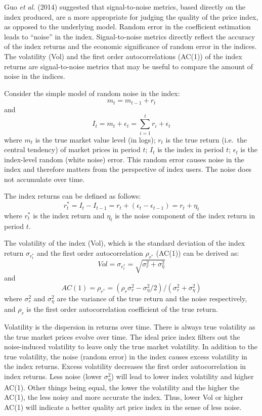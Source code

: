 \documentclass[12pt,]{article}
\begin{document}
Guo \emph{et al.} (2014) suggested that signal-to-noise metrics, based
directly on the index produced, are a more appropriate for judging the
quality of the price index, as opposed to the underlying model. Random
error in the coefficient estimation leads to ``noise'' in the index.
Signal-to-noise metrics directly reflect the accuracy of the index
returns and the economic significance of random error in the indices.
The volatility (Vol) and the first order autocorrelations (AC(1)) of the
index returns are signal-to-noise metrics that may be useful to compare
the amount of noise in the indices.

Consider the simple model of random noise in the index:
\[m_t=m_{t-1}+r_t\] and
\[I_t=m_t+\epsilon_t=\sum_{i=1}^tr_i+\epsilon_t\] where \(m_t\) is the
true market value level (in logs); \(r_t\) is the true return (i.e.~the
central tendency) of market prices in period \(t\); \(I_t\) is the index
in period \(t\); \(\epsilon_t\) is the index-level random (white noise)
error. This random error causes noise in the index and therefore matters
from the perspective of index users. The noise does not accumulate over
time.

The index returns can be defined as follows:
\[r_t^*=I_t-I_{t-1}=r_t+(\epsilon_t-\epsilon_{t-1})= r_t+\eta_t\] where
\(r_t^*\) is the index return and \(\eta_t\) is the noise component of
the index return in period \(t\).

The volatility of the index (Vol), which is the standard deviation of
the index return \(\sigma_{r_t^*}\) and the first order autocorrelation
\(\rho_{r^*}\) (AC(1)) can be derived as:
\[Vol = \sigma_{r_t^*} = \sqrt{\sigma_r^2 + \sigma_\eta^2}\] and
\[AC(1) = \rho_{r^*} = (\rho_r \sigma_r^2 - \sigma_\eta^2/2) / (\sigma_r^2 + \sigma_\eta^2)\]
where \(\sigma_r^2\) and \(\sigma_\eta^2\) are the variance of the true
return and the noise respectively, and \(\rho_r\) is the first order
autocorrelation coefficient of the true return.

Volatility is the dispersion in returns over time. There is always true
volatility as the true market prices evolve over time. The ideal price
index filters out the noise-induced volatility to leave only the true
market volatility. In addition to the true volatility, the noise (random
error) in the index causes excess volatility in the index returns.
Excess volatility decreases the first order autocorrelation in index
returns. Less noise (lower \(\sigma_\eta^2\)) will lead to lower index
volatility and higher AC(1). Other things being equal, the lower the
volatility and the higher the AC(1), the less noisy and more accurate
the index. Thus, lower Vol or higher AC(1) will indicate a better
quality art price index in the sense of less noise.
\end{document}
